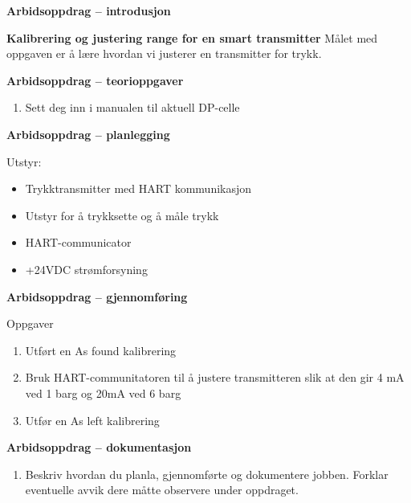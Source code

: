 

\noindent

\vskip 5pt


\textbf{Arbidsoppdrag -- introdusjon}

\textbf{Kalibrering og justering range for en smart transmitter}
Målet med oppgaven er å lære hvordan vi justerer en transmitter for trykk.



\textbf{Arbidsoppdrag -- teorioppgaver}

\begin{enumerate}
	\item Sett deg inn i manualen til aktuell DP-celle
\end{enumerate}
\textbf{Arbidsoppdrag -- planlegging}

Utstyr:
\begin{itemize}[noitemsep]
	\item Trykktransmitter med HART kommunikasjon 
	\item Utstyr for å trykksette og å måle trykk 
	\item HART-communicator 
	\item +24VDC strømforsyning 
\end{itemize}

\textbf{Arbidsoppdrag -- gjennomføring}

Oppgaver\begin{enumerate}
	\item		Utført en As found kalibrering 
	\item		Bruk HART-communitatoren til å justere transmitteren slik at den gir 4 mA ved 1 barg og 20mA ved 6 barg 
	\item		Utfør en As left kalibrering 
\end{enumerate}
\textbf{Arbidsoppdrag -- dokumentasjon}

\begin{enumerate}
	\item Beskriv hvordan du planla, gjennomførte og dokumentere jobben. Forklar eventuelle avvik dere måtte observere under oppdraget. 
\end{enumerate}










\vfil 


\vfil \eject

















